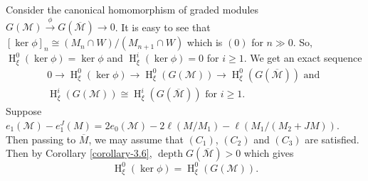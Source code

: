 \documentclass[11pt,reqno]{amsart}
\theoremstyle{definition}
\def\M{{\mathcal M}}
\DeclareMathOperator{\h}{H}
\DeclareMathOperator{\depth}{depth}
\numberwithin{equation}{section}
\begin{document}
 Consider the canonical homomorphism of 
 graded modules $G(\M) \xrightarrow{\phi} G(\overline{\M})\to 0$.  It is easy to see that $[\ker \phi]_n\cong (M_n\cap W)/(M_{n+1}\cap W)$ which is $(0)$ for $n\gg 0$. 
  So,  $\h^0_{\xi}(\ker\phi)=\ker\phi$ and
 $\h^i_{\xi}(\ker\phi)=0$ for $i\geq 1$.  We get an exact sequence
 \begin{eqnarray}\label{new-eq-1}
0\to\h^0_{\xi}(\ker\phi)\to\h^0_{\xi}(G(\M))\to\h^0_{\xi}(G(\overline{\M})) \mbox{ and }\nonumber \\
\h^i_{\xi}(G(\M))\cong\h^i_{\xi}(G(\overline{\M} )) \mbox{ for } i\geq 1. 
 \end{eqnarray} 
 Suppose $e_1(\M )-e_1^J(M)=2e_0(\M)-2\ell(M/M_1)-\ell(M_1/(M_2+JM))$. Then passing to $\overline{M}$, we may assume that $(C_1)$, $(C_2)$ and $(C_3)$ are satisfied. Then by Corollary \ref{corollary-3.6}, $\depth G(\overline{\M})>0$ which gives 
 \begin{equation}\label{new-eq-2}
\h^0_{\xi}(\ker\phi)=\h^0_{\xi}(G(\M)).
 \end{equation}
 
\end{document}
